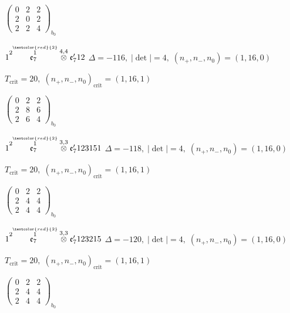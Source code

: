 \documentclass[10pt]{article}
\begin{document}
\hspace{2em}$\left(\begin{smallmatrix}0 & 2 & 2 \\ 2 & 0 & 2 \\ 2 & 2 & 4\end{smallmatrix}\right)_{\!b_0}$

$1\overset{2\overset{\textcolor{red}{2}}{1}}{\mathfrak{e}_7}\overset{4,4}{\otimes}\mathfrak{e}_7'12$ \quad $\Delta=-116,\; |\det|=4,\; (n_+,n_-,n_0)=(1,16,0)$

\hspace{1em}$T_{\text{crit}}=20,\; (n_+,n_-,n_0)_{\text{crit}}=(1,16,1)$

\hspace{2em}$\left(\begin{smallmatrix}0 & 2 & 2 \\ 2 & 8 & 6 \\ 2 & 6 & 4\end{smallmatrix}\right)_{\!b_0}$

\smallskip

$1\overset{2\overset{\textcolor{red}{2}}{1}}{\mathfrak{e}_7}\overset{3,3}{\otimes}\mathfrak{e}_7'123151$ \quad $\Delta=-118,\; |\det|=4,\; (n_+,n_-,n_0)=(1,16,0)$

\hspace{1em}$T_{\text{crit}}=20,\; (n_+,n_-,n_0)_{\text{crit}}=(1,16,1)$

\hspace{2em}$\left(\begin{smallmatrix}0 & 2 & 2 \\ 2 & 4 & 4 \\ 2 & 4 & 4\end{smallmatrix}\right)_{\!b_0}$

\smallskip

$1\overset{2\overset{\textcolor{red}{2}}{1}}{\mathfrak{e}_7}\overset{3,3}{\otimes}\mathfrak{e}_7'123215$ \quad $\Delta=-120,\; |\det|=4,\; (n_+,n_-,n_0)=(1,16,0)$

\hspace{1em}$T_{\text{crit}}=20,\; (n_+,n_-,n_0)_{\text{crit}}=(1,16,1)$

\hspace{2em}$\left(\begin{smallmatrix}0 & 2 & 2 \\ 2 & 4 & 4 \\ 2 & 4 & 4\end{smallmatrix}\right)_{\!b_0}$
\end{document}
